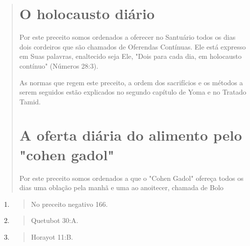 \begin{quote}
\section{O holocausto diário}

Por este preceito somos ordenados a oferecer no Santuário todos os dias
dois cordeiros que são chamados de Oferendas Contínuas. Ele está
ex­presso em Suas palavras, enaltecido seja Ele, "Dois para cada dia, em
holocaus­to contínuo" (Números 28:3).

As normas que regem este preceito, a ordem dos sacrifícios e os mé­todos
a serem seguidos estão explicados no segundo capítulo de Yoma e no
Tratado Tamid.

\section{A oferta diária do alimento pelo "cohen gadol"}

Por este preceito somos ordenados a que o "Cohen Gadol" ofereça todos os
dias uma oblação pela manhã e uma ao anoitecer, chamada de Bolo
\end{quote}

\begin{enumerate}
\def\labelenumi{\arabic{enumi}.}
\setcounter{enumi}{63}
\item
 \begin{quote}
 No preceito negativo 166.
 \end{quote}
\item
 \begin{quote}
 Quetubot 30:A.
 \end{quote}
\item
 \begin{quote}
 Horayot 11:B.
 \end{quote}
\end{enumerate}

